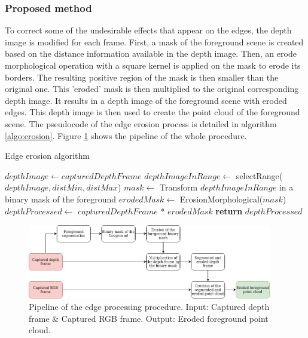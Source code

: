 \begin{figure}[!ht]
\end{figure}


\subsubsection{Proposed method}

To correct some of the undesirable effects that appear on the edges, the depth image is modified for each frame. First, a mask of the foreground scene is created based on the distance information available in the depth image. Then, an erode morphological operation with a square kernel is applied on the mask to erode its borders. The resulting positive region of the mask is then smaller than the original one. This 'eroded' mask is then multiplied to the original corresponding depth image. It results in a depth image of the foreground scene with eroded edges. This depth image is then used to create the point cloud of the foreground scene. The pseudocode of the edge erosion process is detailed in algorithm \ref{algo:erosion}. Figure \ref{figure:edge_pipeline} shows the pipeline of the whole procedure.

\begin{algorithm}
    \caption{Edge erosion algorithm}
    \label{algo:erosion}
    \begin{algorithmic}[1] %
            \State $depthImage\gets capturedDepthFrame$
            \State  $depthImageInRange \gets$ selectRange($depthImage, distMin, distMax$) 
            \State $mask\gets$ Transform $depthImageInRange$ in a binary mask of the foreground
            \State $erodedMask\gets$ ErosionMorphological($mask$) 
            \State $depthProcessed\gets$ $capturedDepthFrame$ * $erodedMask$
            \newline
            \State \textbf{return} $depthProcessed$ 
        \EndProcedure
    \end{algorithmic}
\end{algorithm}


\begin{figure}[H]
    \centering
    \includegraphics[width=0.95\textwidth]{images/visual_enhancement/edge/edge_pipeline.png}
    \caption{Pipeline of the edge processing procedure. Input: Captured depth frame \& Captured RGB frame. Output: Eroded foreground point cloud.}
    \label{figure:edge_pipeline}
\end{figure}





